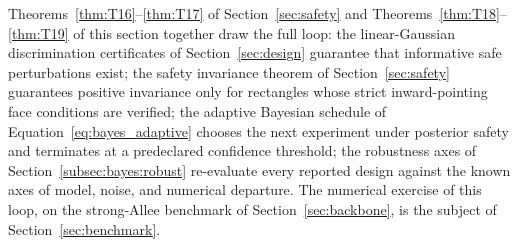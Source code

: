 Theorems~\ref{thm:T16}--\ref{thm:T17} of Section~\ref{sec:safety} and Theorems~\ref{thm:T18}--\ref{thm:T19} of this section together draw the full loop: the linear-Gaussian discrimination certificates of Section~\ref{sec:design} guarantee that informative safe perturbations exist; the safety invariance theorem of Section~\ref{sec:safety} guarantees positive invariance only for rectangles whose strict inward-pointing face conditions are verified; the adaptive Bayesian schedule of Equation~\eqref{eq:bayes_adaptive} chooses the next experiment under posterior safety and terminates at a predeclared confidence threshold; the robustness axes of Section~\ref{subsec:bayes:robust} re-evaluate every reported design against the known axes of model, noise, and numerical departure. The numerical exercise of this loop, on the strong-Allee benchmark of Section~\ref{sec:backbone}, is the subject of Section~\ref{sec:benchmark}.